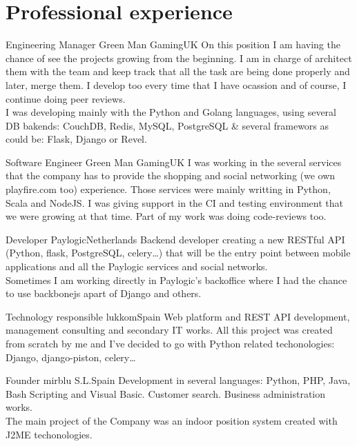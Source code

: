 \documentclass[10pt, a4paper]{moderncv}
\begin{document}
\maketitle


%
%

\section{Professional experience}
{Engineering Manager}
{Green Man Gaming}{UK}{}
{On this position I am having the chance of see the projects growing from the
beginning. I am in charge of architect them with the team and keep track that
all the task are being done properly and later, merge them. I develop too every
time that I have ocassion and of course, I continue doing peer reviews.\\I was
developing mainly with the Python and Golang languages, using several DB
bakends: CouchDB, Redis, MySQL, PostgreSQL \& several framewors as could be:
Flask, Django or Revel.}

{Software Engineer}
{Green Man Gaming}{UK}{}
{I was working in the several services that the company has to provide the
shopping and social networking (we own playfire.com too) experience. Those
services were mainly writting in Python, Scala and NodeJS. I was giving support
in the CI and testing environment that we were growing at that time. Part of my
work was doing code-reviews too.}

{Developer}
{Paylogic}{Netherlands}{}
{Backend developer creating a new RESTful API (Python, flask, PostgreSQL,
celery\ldots) that will be the entry point between mobile applications and all
the Paylogic services and social networks.\\Sometimes I am working directly in
Paylogic's backoffice where I had the chance to use backbonejs apart of Django
and others.}

{Technology responsible}
{lukkom}{Spain}{}
{Web platform and REST API development, management consulting and secondary IT
works. All this project was created from scratch by me and I've decided to go
with Python related techonologies: Django, django-piston, celery\ldots}

{Founder}
{mirblu S.L.}{Spain}{}
{Development in several languages: Python, PHP, Java, Bash Scripting and Visual
Basic. Customer search. Business administration works.\\The main project of the
Company was an indoor position system created with J2ME techonologies.}
\end{document}
